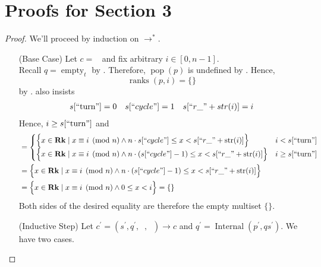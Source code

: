 \documentclass{amsart}
\DeclareMathOperator{\pop}{\mathrm{pop}}
\DeclareMathOperator{\Rk}{\mathbf{Rk}}
\DeclareMathOperator{\Internal}{\mathrm{Internal}}
\DeclareMathOperator{\zprepush}{z_{\mathrm{pre-push}}}
\DeclareMathOperator{\zpostpop}{z_{\mathrm{post-pop}}}
\DeclareMathOperator{\crr}{c_{\text{RR}}}
\DeclareMathOperator{\emt}{\mathrm{empty}}
\DeclareMathOperator{\ranks}{\mathrm{ranks}}
\theoremstyle{definition}
\begin{document}
\appendix

\section{Proofs for Section 3} \label{sec:details}

\lemranks*

\begin{proof}
    We'll proceed by induction on $\to^\ast$.
    \begin{enumerate}
        \item[(Base Case)] Let $c = \crr$ and fix arbitrary $i \in [0, n - 1]$.\\
            Recall $q = \emt_t$ by . 
            Therefore, $\pop(p)$ is undefined by .
            Hence, $$\ranks(p, i) = \{\}$$ by .
             also insists
            \begin{align*}
                s[``\text{turn}"] = 0
                &&
                s[``cycle"] = 1
                &&
                s[``r\_" + str(i)] = i
            \end{align*}
            Hence, $i \geq s[``\text{turn}"]$ and
            \begin{align*}
                &=
                \begin{cases}
                    \Big\{x \in \Rk \mid x \equiv i \pmod n \land n \cdot s[``cycle"] \leq x < s[``r\_" + \mathrm{str}(i)] \Big\} 
                    & i < s[``\text{turn}"]\\
                    \Big\{x \in \Rk \mid x \equiv i \pmod n \land n \cdot (s[``cycle"] - 1) \leq x < s[``r\_" + \mathrm{str}(i)]\Big\} 
                    & i \geq s[``\text{turn}"]
                \end{cases}\\
                &= \Big\{x \in \Rk \mid x \equiv i \pmod n \land n \cdot (s[``cycle"] - 1) \leq x < s[``r\_" + \mathrm{str}(i)]\Big\}\\
                &= \Big\{x \in \Rk \mid x \equiv i \pmod n \land 0 \leq x < i \Big\} = \{\}
            \end{align*}
            Both sides of the desired equality are therefore the empty multiset $\{\}$.
        \item[(Inductive Step)] Let $c^\prime = (s^\prime, q^\prime, \zprepush, \zpostpop) \to c$ and $q^\prime = \Internal(p^\prime, qs^\prime)$.
            We have two cases.
            \begin{enumerate}

\end{enumerate}
\end{enumerate}
\end{proof}
\end{document}
